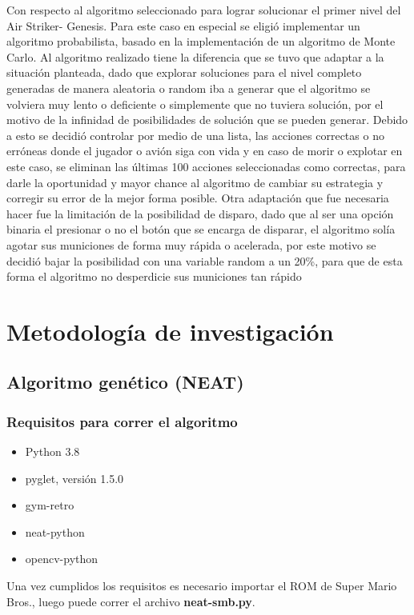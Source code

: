 \documentclass{article}
\begin{document}
Con respecto al algoritmo seleccionado para lograr solucionar el primer nivel del Air Striker- Genesis. Para este caso en especial se eligió implementar un algoritmo probabilista, basado en la implementación de un algoritmo de Monte Carlo.
Al algoritmo realizado tiene la diferencia que se tuvo que adaptar a la situación planteada, dado que explorar soluciones para el nivel completo generadas de manera aleatoria o random iba a generar que el algoritmo se volviera muy lento o deficiente o simplemente que no tuviera solución, por el motivo de la infinidad de posibilidades de solución que se pueden generar. Debido a esto se decidió controlar por medio de una lista, las acciones correctas o no erróneas donde el jugador o avión siga con vida y en caso de morir o explotar en este caso, se eliminan las últimas 100 acciones seleccionadas como correctas, para darle la oportunidad y mayor chance al algoritmo de cambiar su estrategia y corregir su error de la mejor forma posible.
Otra adaptación que fue necesaria hacer fue la limitación de la posibilidad de disparo, dado que al ser una opción binaria el presionar o no el botón que se encarga de disparar, el algoritmo solía agotar sus municiones de forma muy rápida o acelerada, por este motivo se decidió bajar la posibilidad con una variable random a un 20\%, para que de esta forma el algoritmo no desperdicie sus municiones tan rápido
\section{Metodología de investigación}

\subsection{Algoritmo genético (NEAT)}

\subsubsection{Requisitos para correr el algoritmo}
\begin{itemize}
  \item Python 3.8
  \item pyglet, versión 1.5.0
  \item gym-retro
  \item neat-python
  \item opencv-python
\end{itemize}
Una vez cumplidos los requisitos es necesario importar el ROM de Super Mario Bros., luego puede correr el archivo \textbf{neat-smb.py}.
\end{document}
